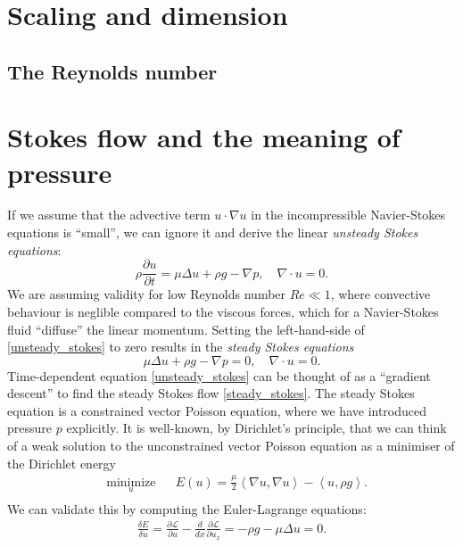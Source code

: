\documentclass[11pt,a4paper]{memoir}
\newcommand{\inner}[1]{\left<#1\right>}
\newcommand{\fancyL}{\mathcal{L}}
\newcommand{\Part}[2]{\frac{\partial #1}{\partial #2}}
\begin{document}
\section{Scaling and dimension}
\subsection{The Reynolds number}

\section{Stokes flow and the meaning of pressure}\label{pressure_derivation}
If we assume that the advective term $u\cdot \nabla u$ in the incompressible Navier-Stokes equations is ``small'',
we can ignore it and derive the linear \textit{unsteady Stokes equations}:
\begin{equation}\label{unsteady_stokes}
    \rho\Part{u}{t} = \mu\Delta u + \rho g - \nabla p, \quad \nabla\cdot u = 0.
\end{equation}
We are assuming validity for low Reynolds number $Re \ll 1$, where convective behaviour is neglible compared to the viscous forces, which for a
Navier-Stokes fluid ``diffuse'' the linear momentum. Setting the left-hand-side of \eqref{unsteady_stokes} to zero results in the \textit{steady Stokes equations}
\begin{equation}\label{steady_stokes}
    \mu\Delta u + \rho g - \nabla p = 0,\quad \nabla\cdot u = 0.
\end{equation}
Time-dependent equation \eqref{unsteady_stokes} can be thought of as a ``gradient descent'' to find the steady Stokes flow \eqref{steady_stokes}.
The steady Stokes equation is a constrained vector Poisson equation, where we have introduced pressure $p$ explicitly.
It is well-known, by Dirichlet's principle, that we can think
of a weak solution to the unconstrained vector Poisson equation as a minimiser of the Dirichlet energy
\begin{equation}
\begin{aligned}
& \underset{u}{\text{minimize}}
& & E(u) =  \frac{\mu}{2} \inner{\nabla u, \nabla u} - \inner{u, \rho g}.\\
\end{aligned}
\end{equation}
\newcommand{\energygradient}{\frac{\delta E}{\delta u}}
We can validate this by computing the Euler-Lagrange equations:
\begin{align*}
    \frac{\delta E}{\delta u} = \Part{\fancyL}{u} - \frac{d}{dx}\Part{\fancyL}{u_x}
                              = -\rho g - \mu\Delta u = 0.
\end{align*}
\end{document}
